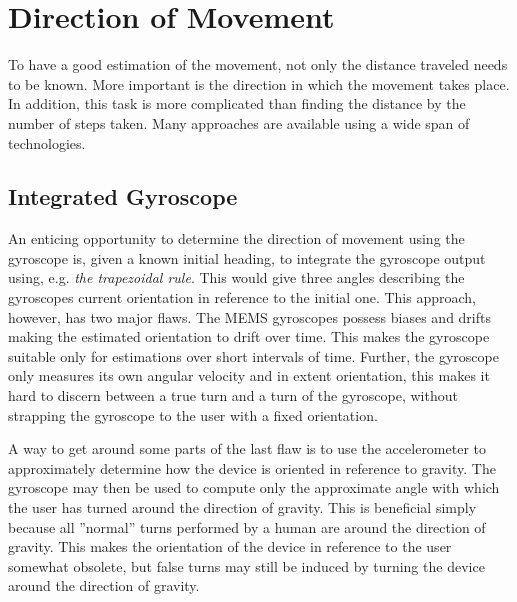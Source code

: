 \documentclass{LTHthesis}
\begin{document}
\section{Direction of Movement}
%
To have a good estimation of the movement, not only the distance traveled needs to be known. More important is the direction in which the movement takes place. In addition, this task is more complicated than finding the distance by the number of steps taken. Many approaches are available using a wide span of technologies. 
%
\subsection{Integrated Gyroscope}
%
An enticing opportunity to determine the direction of movement using the gyroscope is, given a known initial heading, to integrate the gyroscope output using, e.g. \emph{the trapezoidal rule}. This would give three angles describing the gyroscopes current orientation in reference to the initial one. This approach, however, has two major flaws. The MEMS gyroscopes possess biases and drifts making the estimated orientation to drift over time. This makes the gyroscope suitable only for estimations over short intervals of time. Further, the gyroscope only measures its own angular velocity and in extent orientation, this makes it hard to discern between a true turn and a turn of the gyroscope, without strapping the gyroscope to the user with a fixed orientation. 

A way to get around some parts of the last flaw is to use the accelerometer to approximately determine how the device is oriented in reference to gravity. The gyroscope may then be used to compute only the approximate angle with which the user has turned around the direction of gravity. This is beneficial simply because all ''normal'' turns performed by a human are around the direction of gravity. This makes the orientation of the device in reference to the user somewhat obsolete, but false turns may still be induced by turning the device around the direction of gravity.
% 
\end{document}
